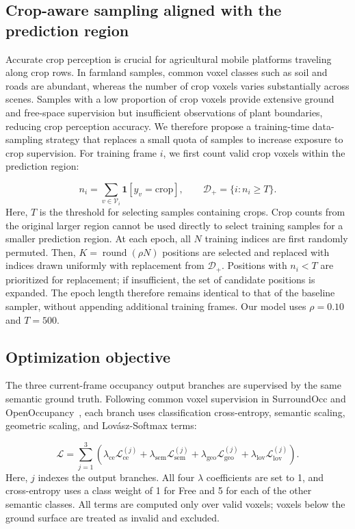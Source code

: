 \documentclass[a4paper,fleqn]{cas-sc}
\newcommand{\V}{\mathcal{V}}
\begin{document}
\subsection{Crop-aware sampling aligned with the prediction region}\label{sec:cropsample}
Accurate crop perception is crucial for agricultural mobile platforms traveling along crop rows. In farmland samples, common voxel classes such as soil and roads are abundant, whereas the number of crop voxels varies substantially across scenes.
Samples with a low proportion of crop voxels provide extensive ground and free-space supervision but insufficient observations of plant boundaries, reducing crop perception accuracy.
We therefore propose a training-time data-sampling strategy that replaces a small quota of samples to increase exposure to crop supervision.
For training frame $i$, we first count valid crop voxels within the prediction region:

\begin{equation}
n_i=\sum_{v\in\V_i}\mathbf 1[y_v=\mathrm{crop}],\qquad
\mathcal D_+=\{i:n_i\ge T\}.
\end{equation}
Here, $T$ is the threshold for selecting samples containing crops. Crop counts from the original larger region cannot be used directly to select training samples for a smaller prediction region.
At each epoch, all $N$ training indices are first randomly permuted. Then, $K=\operatorname{round}(\rho N)$ positions are selected and replaced with indices drawn uniformly with replacement from $\mathcal D_+$.
Positions with $n_i<T$ are prioritized for replacement; if insufficient, the set of candidate positions is expanded.
The epoch length therefore remains identical to that of the baseline sampler, without appending additional training frames.
Our model uses $\rho=0.10$ and $T=500$.

\subsection{Optimization objective}\label{sec:loss}
The three current-frame occupancy output branches are supervised by the same semantic ground truth.
Following common voxel supervision in SurroundOcc and OpenOccupancy~\citep{wei2023surroundocc,wang2023openoccupancy}, each branch uses classification cross-entropy, semantic scaling, geometric scaling, and Lov\'{a}sz-Softmax terms:

\begin{equation}
\mathcal L=\sum_{j=1}^{3}\left(\lambda_{\mathrm{ce}}\mathcal L_{\mathrm{ce}}^{(j)}+
\lambda_{\mathrm{sem}}\mathcal L_{\mathrm{sem}}^{(j)}+
\lambda_{\mathrm{geo}}\mathcal L_{\mathrm{geo}}^{(j)}+
\lambda_{\mathrm{lov}}\mathcal L_{\mathrm{lov}}^{(j)}\right).
\end{equation}
Here, $j$ indexes the output branches. All four $\lambda$ coefficients are set to 1, and cross-entropy uses a class weight of 1 for Free and 5 for each of the other semantic classes.
All terms are computed only over valid voxels; voxels below the ground surface are treated as invalid and excluded.
\end{document}
